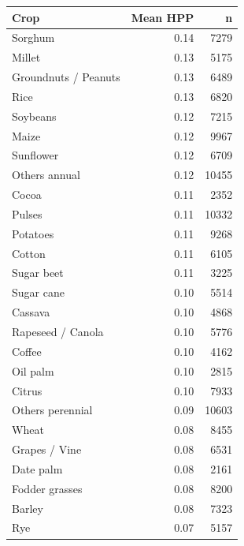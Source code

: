 \begin{tabular}{lrr}
\toprule
Crop & Mean HPP & n \\
\midrule
Sorghum & 0.14 & 7279 \\
Millet & 0.13 & 5175 \\
Groundnuts / Peanuts & 0.13 & 6489 \\
Rice & 0.13 & 6820 \\
Soybeans & 0.12 & 7215 \\
Maize & 0.12 & 9967 \\
Sunflower & 0.12 & 6709 \\
Others annual & 0.12 & 10455 \\
Cocoa & 0.11 & 2352 \\
Pulses & 0.11 & 10332 \\
Potatoes & 0.11 & 9268 \\
Cotton & 0.11 & 6105 \\
Sugar beet & 0.11 & 3225 \\
Sugar cane & 0.10 & 5514 \\
Cassava & 0.10 & 4868 \\
Rapeseed / Canola & 0.10 & 5776 \\
Coffee & 0.10 & 4162 \\
Oil palm & 0.10 & 2815 \\
Citrus & 0.10 & 7933 \\
Others perennial & 0.09 & 10603 \\
Wheat & 0.08 & 8455 \\
Grapes / Vine & 0.08 & 6531 \\
Date palm & 0.08 & 2161 \\
Fodder grasses & 0.08 & 8200 \\
Barley & 0.08 & 7323 \\
Rye & 0.07 & 5157 \\
\bottomrule
\end{tabular}
